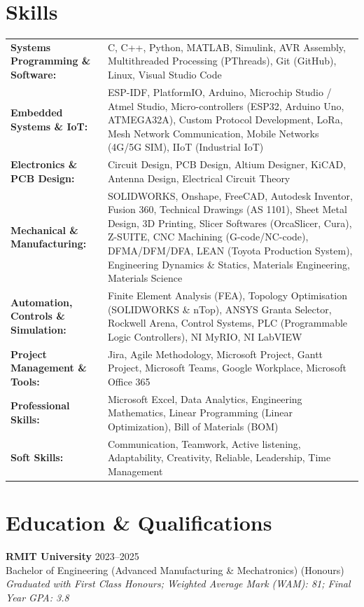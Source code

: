 \documentclass[11pt,a4paper]{article}
\begin{document}
\section{Skills}
{ %
\renewcommand{\arraystretch}{1.4} %
\begin{tabularx}{\textwidth}{@{} >{\bfseries}l X @{}}
    Systems Programming \& Software: & C, C++, Python, MATLAB, Simulink, AVR Assembly, Multithreaded Processing (PThreads), Git (GitHub), Linux, Visual Studio Code \\
    Embedded Systems \& IoT: & ESP-IDF, PlatformIO, Arduino, Microchip Studio / Atmel Studio, Micro-controllers (ESP32, Arduino Uno, ATMEGA32A), Custom Protocol Development, LoRa, Mesh Network Communication, Mobile Networks (4G/5G SIM), IIoT (Industrial IoT) \\
    Electronics \& PCB Design: & Circuit Design, PCB Design, Altium Designer, KiCAD, Antenna Design, Electrical Circuit Theory \\
    Mechanical \& Manufacturing: & SOLIDWORKS, Onshape, FreeCAD, Autodesk Inventor, Fusion 360, Technical Drawings (AS 1101), Sheet Metal Design, 3D Printing, Slicer Softwares (OrcaSlicer, Cura), Z-SUITE, CNC Machining (G-code/NC-code), DFMA/DFM/DFA, LEAN (Toyota Production System), Engineering Dynamics \& Statics, Materials Engineering, Materials Science \\
    Automation, Controls \& Simulation: & Finite Element Analysis (FEA), Topology Optimisation (SOLIDWORKS \& nTop), ANSYS Granta Selector, Rockwell Arena, Control Systems, PLC (Programmable Logic Controllers), NI MyRIO, NI LabVIEW \\
    Project Management \& Tools: & Jira, Agile Methodology, Microsoft Project, Gantt Project, Microsoft Teams, Google Workplace, Microsoft Office 365 \\
    Professional Skills: & Microsoft Excel, Data Analytics, Engineering Mathematics, Linear Programming (Linear Optimization), Bill of Materials (BOM)  \\
    Soft Skills: & Communication, Teamwork, Active listening, Adaptability, Creativity, Reliable, Leadership, Time Management \\
\end{tabularx}
} %

\section{Education \& Qualifications}
\textbf{RMIT University} \hfill {2023--2025} \\
Bachelor of Engineering (Advanced Manufacturing \& Mechatronics) (Honours) \\
\textit{Graduated with First Class Honours; Weighted Average Mark (WAM): 81; Final Year GPA: 3.8}
\newpage %
\end{document}
